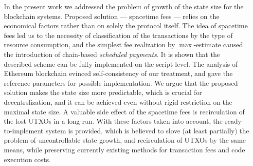 \documentclass[]{llncs}   %
\newcommand{\authnote}[2]{\marginpar{\parbox{\marginparwidth}{\tiny %
  \textsf{#1 {\textcolor{blue}{notes: #2}}}}}%
  \textcolor{blue}{\textbf{\dag}}}
\newcommand{\authnote}[2]{
  \textsf{#1\textcolor{blue}{ #2}}}
\newcommand{\authnote}[2]{}
\newcommand{\dnote}[1]{{\authnote{\textcolor{red}{Dima notes:}}{#1}}}
\begin{document}
\dnote{Other benefits like fixed reward and coin recirculation?}
In the present work we addressed the problem of growth of the state size for the
blockchain systems. Proposed solution --- spacetime fees --- relies on the 
economical factors rather than on solely the protocol itself. The idea of
spacetime fees led us to the necessity of classification of the transactions by
the type of resource consumption, and the simplest fee realization by
$\max$-estimate caused the introduction of chain-based {\it scheduled payments}.
It is shown that the described scheme can be fully implemented on the script
level. The analysis of Ethereum blockchain evinced self-consistency of our 
treatment, and gave the reference parameters for possible implementation. We
argue that the proposed solution makes the state size more predictable, which is
crucial for decentrslization, and it can be achieved even without rigid
restriction on the maximal state size. A valuable side effect of the spacetime
fees is recirculation of the lost UTXOs in a long-run. With these factors taken
into account, the ready-to-implement system is provided, which is believed to
slove (at least partially) the problem of uncontrollable state growth, and 
recirculation of UTXOs by the same means, while preserving currently existing
methods for transaction fees and code execution costs.




\appendix
\end{document}
